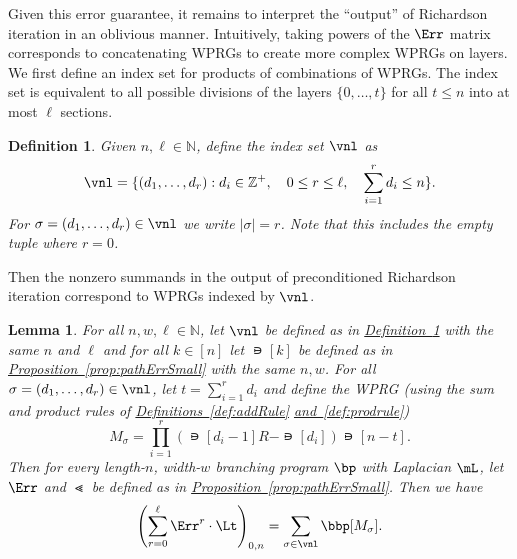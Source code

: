 \documentclass[11pt]{article}
\newcommand{\expref}[2]{\texorpdfstring{\hyperref[#2]{#1~\ref{#2}}}{#1~\ref{#2}}}
\newtheorem{lemma}[theorem]{Lemma}
\newtheorem{definition}[theorem]{Definition}
\newcommand{\Z}{{\mathbb Z}}
\newcommand{\N}{{\mathbb N}}
\begin{document}
Given this error guarantee, it remains to interpret the ``output'' of Richardson iteration in an oblivious manner. Intuitively, taking powers of the $\Err$ matrix corresponds to concatenating WPRGs to create more complex WPRGs on layers. We first define an index set for products of combinations of WPRGs. The index set is equivalent to all possible divisions of the layers $\{0,\ldots,t\}$ for all $t\leq n$ into at most $\ell$ sections.
\begin{definition}\label{def:pathIndex}
Given $n,\ell \in \N$, define the index set $\vnl$ as
\[\vnl = \{(d_1,\dots, d_r) : d_i\in \Z^+, \quad 0\leq r\leq \ell,\quad \sum_{i=1}^rd_i\leq n\}.\]
For $\sigma=(d_1,\dots,d_r) \in \vnl$ we write $|\sigma|=r$. Note that this includes the empty tuple where $r=0$.
\end{definition}
Then the nonzero summands in the output of preconditioned %
Richardson  %
iteration correspond to WPRGs indexed by $\vnl$.
\begin{lemma}\label{lem:richardSummandsPath}
For all $n,w,\ell \in \N$, let $\vnl$ be defined as in \expref{Definition}{def:pathIndex} with the same $n$ and $\ell$ and for all $k\in[n]$ let $\nis[k]$ be defined as in \expref{Proposition}{prop:pathErrSmall} with the same $n,w$. For all $\sigma=(d_1,\dots,d_r) \in \vnl$, let $t=\sum_{i=1}^rd_i$ and define the WPRG (using the sum and product rules of 
%
\expref{Definitions}{def:addRule} \expref{and}{def:prodrule})  %
\[M_\sigma = \prod_{i=1}^r\left(\nis[d_i-1]R-\nis[d_i]\right)\nis[n-t].\]
Then for every length-$n$, width-$w$ branching program $\bp$ with Laplacian $\mL$, let $\Err$ and $\Lt$ be defined as in \expref{Proposition}{prop:pathErrSmall}. Then we have
\[\left(\sum_{r=0}^\ell\Err^r\cdot \Lt\right)_{0,n} = \sum_{\sigma \in \vnl}\bbp[M_\sigma].\]
\end{lemma}
\end{document}
